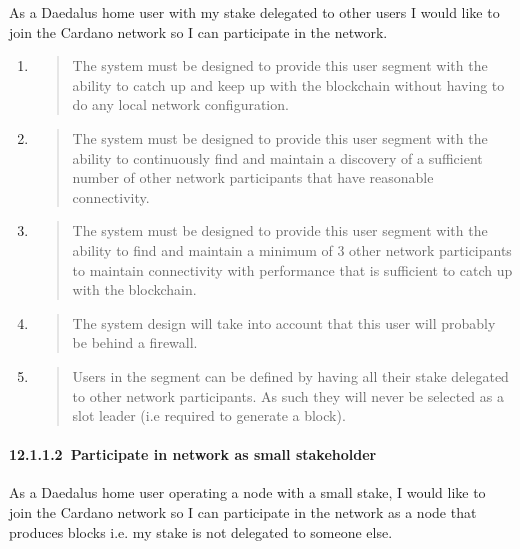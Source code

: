 \documentclass[]{article}
\let\oldparagraph\paragraph
\renewcommand{\paragraph}[1]{\oldparagraph{#1}\mbox{}}
\begin{document}
As a Daedalus home user with my stake delegated to other users I would
like to join the Cardano network so I can participate in the network.

\begin{enumerate}
\def\labelenumi{\arabic{enumi}.}
\item
  \begin{quote}
  The system must be designed to provide this user segment with the
  ability to catch up and keep up with the blockchain without having to
  do any local network configuration.
  \end{quote}
\item
  \begin{quote}
  The system must be designed to provide this user segment with the
  ability to continuously find and maintain a discovery of a sufficient
  number of other network participants that have reasonable
  connectivity.
  \end{quote}
\item
  \begin{quote}
  The system must be designed to provide this user segment with the
  ability to find and maintain a minimum of 3 other network participants
  to maintain connectivity with performance that is sufficient to catch
  up with the blockchain.
  \end{quote}
\item
  \begin{quote}
  The system design will take into account that this user will probably
  be behind a firewall.
  \end{quote}
\item
  \begin{quote}
  Users in the segment can be defined by having all their stake
  delegated to other network participants. As such they will never be
  selected as a slot leader (i.e required to generate a block).
  \end{quote}
\end{enumerate}

\hypertarget{participate-in-network-as-small-stakeholder}{%
\paragraph{​12.1.1.2​~Participate in network as small stakeholder
}\label{participate-in-network-as-small-stakeholder}}

As a Daedalus home user operating a node with a small stake, I would
like to join the Cardano network so I can participate in the network as
a node that produces blocks i.e. my stake is not delegated to someone
else.
\end{document}
